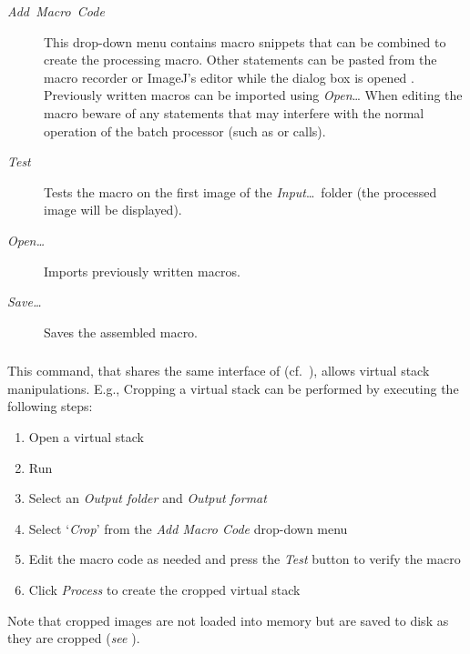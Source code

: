 \begin{description}
\item [{\emph{Add\ Macro\ Code}}] This drop-down menu contains macro
snippets that can be combined to create the processing macro. Other
statements can be pasted from the macro recorder or ImageJ's editor
while the dialog box is opened \cite{C-NonBlockingDialog}. Previously
written macros can be imported using \emph{Open}\ldots{} When editing
the macro beware of any statements that may interfere with the normal
operation of the batch processor (such as or 
calls).
\item [{\emph{Test}}] Tests the macro on the first image of the \emph{Input}\ldots{}\ folder
(the processed image will be displayed).
\item [{\emph{Open\ldots{}}}] Imports previously written macros.
\item [{\emph{Save\ldots{}}}] Saves the assembled macro.
\end{description}



\subsubsection[\protect\userinterface{Virtual Stack\ldots{}}]{\protect{}\label{sub:Virtual-Stack...}\improvement{}}

This command, that shares the same interface of 
(cf.\ ),
allows virtual stack manipulations. E.g., Cropping a virtual stack
can be performed by executing the following steps:
\begin{enumerate}
\item Open a virtual stack
\item Run 
\item Select an \emph{Output folder} and \emph{Output} \emph{format} 
\item Select `\emph{Crop}' from the \emph{Add Macro Code} drop-down menu
\item Edit the macro code as needed and press the \emph{Test} button to
verify the macro 
\item Click \emph{Process} to create the cropped virtual stack 
\end{enumerate}
Note that cropped images are not loaded into memory but are saved
to disk as they are cropped (\emph{see} ).


